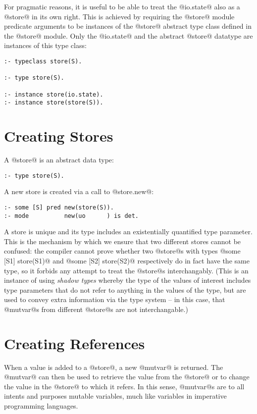 For pragmatic reasons, it is useful to be able to treat the @io.state@
also as a @store@ in its own right.  This is achieved by requiring the
@store@ module predicate arguments to be instances of the @store@
abstract type class defined in the @store@ module.  Only the @io.state@
and the abstract @store@ datatype are instances of this type class:
\begin{verbatim}
:- typeclass store(S).

:- type store(S).

:- instance store(io.state).
:- instance store(store(S)).
\end{verbatim}

\section{Creating Stores}

A @store@ is an abstract data type:
\begin{verbatim}
:- type store(S).
\end{verbatim}

A new store is created via a call to @store.new@:
\begin{verbatim}
:- some [S] pred new(store(S)).
:- mode          new(uo      ) is det.
\end{verbatim}
A store is unique and its type includes an existentially quantified type
parameter.  This is the mechanism by which we ensure that two different
stores cannot be confused: the compiler cannot prove whether two
@store@s with types @some [S1] store(S1)@ and @some [S2] store(S2)@
respectively do in fact have the same type, so it forbids any attempt to
treat the @store@s interchangably.  (This is an instance of using
\emph{shadow types} whereby the type of the values of interest includes
type parameters that do not refer to anything in the values of the type,
but are used to convey extra information via the type system -- in this
case, that @mutvar@s from different @store@s are not interchangable.)

\section{Creating References}

When a value is added to a @store@, a new @mutvar@ is returned.  The
@mutvar@ can then be used to retrieve the value from the @store@ or to
change the value in the @store@ to which it refers.  In this sense,
@mutvar@s are to all intents and purposes mutable variables, much like
variables in imperative programming languages.

